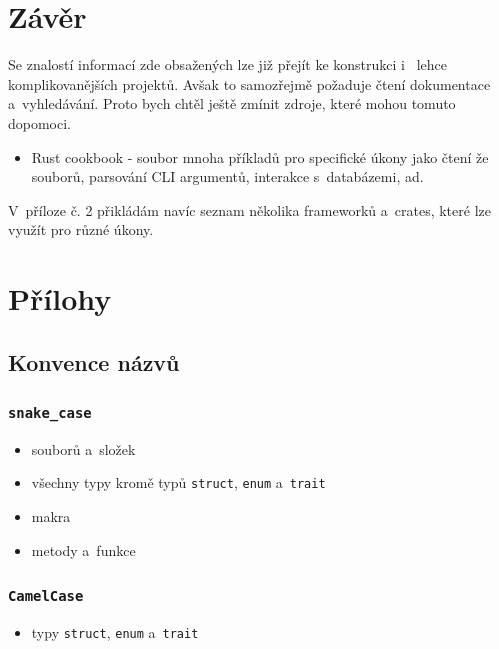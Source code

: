\documentclass[a4paper, 12pt]{article} %
\begin{document}
\section{Závěr}
	Se znalostí informací zde obsažených lze již přejít ke konstrukci i~ lehce komplikovanějších projektů. Avšak to samozřejmě požaduje čtení dokumentace a~vyhledávání. Proto bych chtěl ještě zmínit zdroje, které mohou tomuto dopomoci.
	\begin{itemize}
		\item Rust cookbook\cite{cookbook} - soubor mnoha příkladů pro specifické úkony jako čtení že souborů, parsování CLI argumentů, interakce s~databázemi, ad.
	\end{itemize}
	
	V~příloze č. 2 přikládám navíc seznam několika frameworků a~crates, které lze využít pro různé úkony.





\section{Přílohy}
	\subsection{Konvence názvů}
		\hypertarget{konvence_nazvu}{}


		\subsubsection*{\texttt{snake\_case}}
			\begin{itemize}
				\item souborů a~složek
				\item všechny typy kromě typů \texttt{struct}, \texttt{enum} a~\texttt{trait}
				\item makra
				\item metody a~funkce
			\end{itemize}


		\subsubsection*{\texttt{CamelCase}}
			\begin{itemize}
				\item typy \texttt{struct}, \texttt{enum} a~\texttt{trait}
			\end{itemize}
\end{document}
